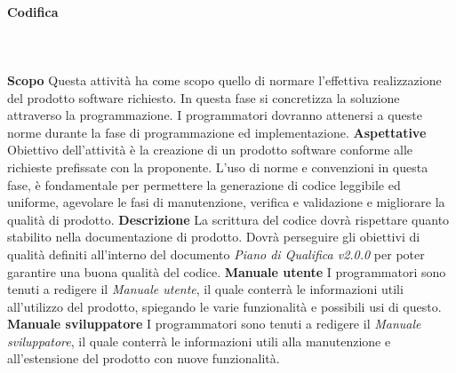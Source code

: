 		\paragraph{Codifica} \mbox{}\\ \mbox{}\\
			\textbf{Scopo} \newline \newline
			Questa attività ha come scopo quello di normare l'effettiva realizzazione del prodotto software richiesto. In questa fase si concretizza la soluzione attraverso la programmazione. I programmatori dovranno attenersi a queste norme durante la fase di programmazione ed implementazione. \newline \newline
			\textbf{Aspettative} \newline \newline
			Obiettivo dell'attività è la creazione di un prodotto software conforme alle richieste prefissate con la proponente.
			L'uso di norme e convenzioni in questa fase, è fondamentale per permettere la generazione di codice leggibile ed uniforme,  agevolare le fasi di manutenzione, verifica e validazione e migliorare la qualità di prodotto. \newline \newline
			\textbf{Descrizione} \newline \newline
			La scrittura del codice dovrà rispettare quanto stabilito nella documentazione di prodotto. Dovrà perseguire gli obiettivi di qualità definiti all'interno del documento \textit{Piano di Qualifica v2.0.0} per poter garantire una buona qualità del codice. \newline \newline
			\textbf{Manuale utente} \newline \newline
			I programmatori sono tenuti a redigere il \textit{Manuale utente}, il quale conterrà le informazioni utili all'utilizzo del prodotto, spiegando le varie funzionalità e possibili usi di questo. \newline \newline
			\textbf{Manuale sviluppatore} \newline \newline
			I programmatori sono tenuti a redigere il \textit{Manuale sviluppatore}, il quale conterrà le informazioni utili alla manutenzione e all'estensione del prodotto con nuove funzionalità. \newline \newline
